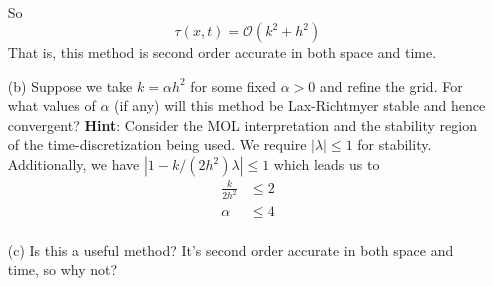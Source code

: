 \documentclass{article}
\begin{document}
\begin{itemize}
\begin{align*}
    \end{align*}
    So 
    \[\tau(x,t) = \mathcal{O}(k^2 + h^2)\]
    That is, this method is second order accurate in both space and time.
    \newline\newline
    \item[(b)] Suppose we take $k = \alpha h^2$ for some fixed $\alpha > 0$ and refine the grid. For what values of $\alpha$ (if any) will this method be Lax-Richtmyer stable and hence convergent?
    \newline
    \textbf{Hint}: Consider the MOL interpretation and the stability region of the time-discretization being used.
    \newline
    We require $|\lambda| \leq 1$ for stability. Additionally, we have $|1 - k/(2h^2)\lambda| \leq 1$ which leads us to 
    \begin{align*}
        \frac{k}{2h^2} &\leq 2 \\
        \alpha &\leq 4 \\
    \end{align*}
    
    
    
    \item[(c)] Is this a useful method?
    \newline
    It's second order accurate in both space and time, so why not?
    
\end{itemize}
\end{document}
